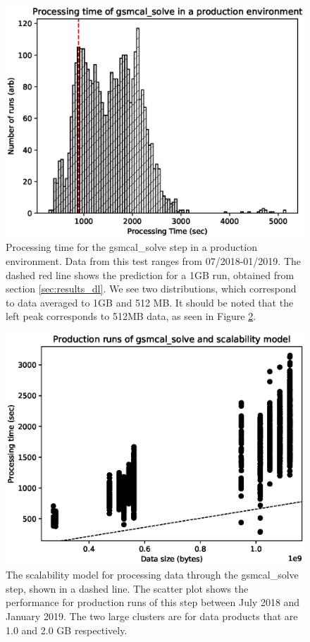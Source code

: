 \begin{figure}
    \includegraphics[width=0.95\linewidth]{figures/Production_gsmcal_1GB_2.eps}
      \caption{Processing time for the {\selectfont gsmcal\_solve} step in a production environment. Data from this test ranges from 07/2018-01/2019. The dashed red line shows the prediction for a 1GB run, obtained from section \ref{sec:results_dl}. We see two distributions, which correspond to data averaged to 1GB and 512 MB.  It should be noted that the left peak corresponds to 512MB data, as seen in Figure \ref{fig:prod_gsmcal_times}.}
	\label{fig:prod_gsmcal}
\end{figure}


\begin{figure}
    \includegraphics[width=0.95\linewidth]{figures/gsmcal_solve_size_prod.eps}
      \caption{The scalability model for processing data through the {\selectfont gsmcal\_solve} step, shown in a dashed line. The scatter plot shows the performance for production runs of this step between July 2018 and January 2019. The two large clusters are for data products that are 1.0 and 2.0 GB respectively. }
	\label{fig:prod_gsmcal_times}
\end{figure}


